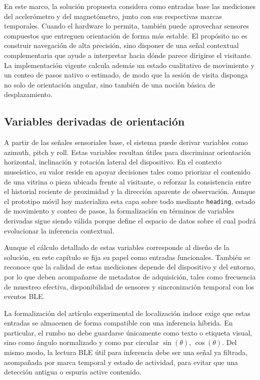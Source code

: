 En este marco, la solución propuesta considera como entradas base las mediciones del acelerómetro y del magnetómetro, junto con sus respectivas marcas temporales. Cuando el hardware lo permita, también puede aprovechar sensores compuestos que entreguen orientación de forma más estable. El propósito no es construir navegación de alta precisión, sino disponer de una señal contextual complementaria que ayude a interpretar hacia dónde parece dirigirse el visitante. La implementación vigente calcula además un estado cualitativo de movimiento y un conteo de pasos nativo o estimado, de modo que la sesión de visita disponga no solo de orientación angular, sino también de una noción básica de desplazamiento.

\subsection{Variables derivadas de orientación}

A partir de las señales sensoriales base, el sistema puede derivar variables como azimuth, pitch y roll. Estas variables resultan útiles para discriminar orientación horizontal, inclinación y rotación lateral del dispositivo. En el contexto museístico, su valor reside en apoyar decisiones tales como priorizar el contenido de una vitrina o pieza ubicada frente al visitante, o reforzar la consistencia entre el historial reciente de proximidad y la dirección aparente de observación. Aunque el prototipo móvil hoy materializa esta capa sobre todo mediante \texttt{heading}, estado de movimiento y conteo de pasos, la formalización en términos de variables derivadas sigue siendo válida porque define el espacio de datos sobre el cual podrá evolucionar la inferencia contextual.

Aunque el cálculo detallado de estas variables corresponde al diseño de la solución, en este capítulo se fija su papel como entradas funcionales. También se reconoce que la calidad de estas mediciones depende del dispositivo y del entorno, por lo que deben acompañarse de metadatos de adquisición, tales como frecuencia de muestreo efectiva, disponibilidad de sensores y sincronización temporal con los eventos BLE.

La formalización del artículo experimental de localización indoor exige que estas entradas se almacenen de forma compatible con una inferencia híbrida. En particular, el rumbo no debe guardarse únicamente como texto o etiqueta visual, sino como ángulo normalizado y como par circular \(\sin(\theta)\), \(\cos(\theta)\). Del mismo modo, la lectura BLE útil para inferencia debe ser una señal ya filtrada, acompañada por marca temporal y estado de actividad, para evitar que una detección antigua o espuria active contenido.

